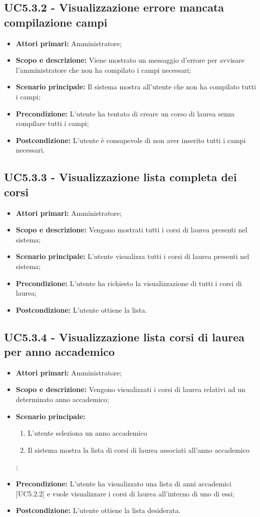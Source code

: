 \documentclass[AnalisiDeiRequisiti.tex]{subfiles}
\begin{document}
\subsection{UC5.3.2 - Visualizzazione errore mancata compilazione campi}
\begin{itemize}
	\item \textbf{Attori primari:} Amministratore;
	\item \textbf{Scopo e descrizione:} Viene mostrato un messaggio d'errore per avvisare l'amministratore che non ha compilato i campi necessari;
	\item \textbf{Scenario principale:} Il sistema mostra all'utente che non ha compilato tutti i campi;
	\item \textbf{Precondizione:} L'utente ha tentato di creare un corso di laurea senza compilare tutti i campi; 
	\item \textbf{Postcondizione:} L'utente è consapevole di non aver inserito tutti i campi necessari.
\end{itemize}\subsection{UC5.3.3 - Visualizzazione lista completa dei corsi}
\begin{itemize}
	\item \textbf{Attori primari:} Amministratore;
	\item \textbf{Scopo e descrizione:} Vengono mostrati tutti i corsi di laurea presenti nel sistema;
	\item \textbf{Scenario principale:} L'utente visualizza tutti i corsi di laurea presenti nel sistema;
	\item \textbf{Precondizione:} L'utente ha richiesto la visualizzazione di tutti i corsi di laurea; 
	\item \textbf{Postcondizione:} L'utente ottiene la lista.
\end{itemize}
\subsection{UC5.3.4 - Visualizzazione lista corsi di laurea per anno accademico}
\begin{itemize}
	\item \textbf{Attori primari:} Amministratore;
	\item \textbf{Scopo e descrizione:} Vengono visualizzati i corsi di laurea relativi ad un determinato anno accademico;
	\item \textbf{Scenario principale:}
	\begin{enumerate}
		\item L'utente seleziona un anno accademico
		\item Il sistema mostra la lista di corsi di laurea associati all'anno accademico
	\end{enumerate};
	\item \textbf{Precondizione:} L'utente ha visualizzato una lista di anni accademici [UC5.2.2] e vuole visualizzare i corsi di laurea all'interno di uno di essi; 
	\item \textbf{Postcondizione:} L'utente ottiene la lista desiderata.
\end{itemize}
\end{document}
